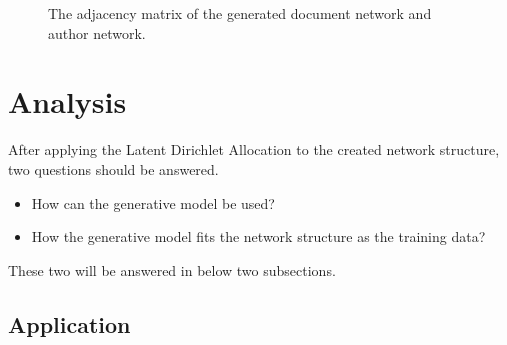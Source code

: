 \documentclass[letterpaper]{article}
\begin{document}
\begin{figure}[ht]
\caption{The adjacency matrix of the generated document network and author network.}
\label{fig:gene_ad_mat}
\end{figure}

\section{Analysis}

After applying the Latent Dirichlet Allocation to the created network structure, two questions should be answered.
\begin{itemize}
\item How can the generative model be used?
\item How the generative model fits the network structure as the training data?
\end{itemize}
These two will be answered in below two subsections.

\subsection{Application}
\end{document}

